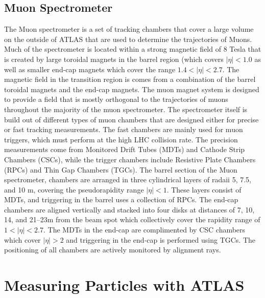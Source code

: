 \subsection{Muon Spectrometer}
The Muon spectrometer is a set of tracking chambers that cover a large volume on the outside of ATLAS that are used to determine the trajectories of Muons.
Much of the spectrometer is located within a strong magnetic field of 8 Tesla that is created by large toroidal magnets in the barrel region (which covers $|\eta| < 1.0$ as well as smaller end-cap magnets which cover the range $1.4 < |\eta| < 2.7$. 
The magnetic field in the transition region is comes from a combination of the barrel toroidal magnets and the end-cap magnets.
The muon magnet system is designed to provide a field that is mostly orthogonal to the trajectories of muons throughout the majority of the muon spectrometer.
The spectrometer itself is build out of different types of muon chambers that are designed either for precise or fast tracking measurements.
The fast chambers are mainly used for muon triggers, which must perform at the high LHC collision rate.
The precision measurements come from Monitored Drift Tubes (MDTs) and Cathode Strip Chambers (CSCs), while the trigger chambers include Resistive Plate Chambers (RPCs) and Thin Gap Chambers (TGCs).
The barrel section of the Muon spectrometer, chambers are arranged in three cylindrical layers of radaii 5, 7.5, and 10 m, covering the pseudorapidity range $|\eta| < 1$.
These layers consist of MDTs, and triggering in the barrel uses a collection of RPCs.
The end-cap chambers are aligned vertically and stacked into four disks at distances of 7, 10, 14, and 21–23m from the beam spot which collectively cover the rapidity range of $1 <|\eta|< 2.7$. 
The MDTs in the end-cap are complimented by CSC chambers which cover $|\eta| > 2$ and triggering in the end-cap is performed using TGCs.
The positioning of all chambers are actively monitored by alignment rays.


\section{Measuring Particles with ATLAS}


